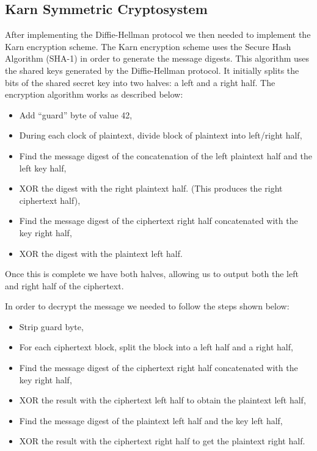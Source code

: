 \documentclass[10pt]{article}
\begin{document}
\subsection{Karn Symmetric Cryptosystem}
After implementing the Diffie-Hellman protocol we then needed to implement the
Karn encryption scheme. The Karn encryption scheme uses the Secure Hash
Algorithm (SHA-1) in order to generate the message digests. This algorithm uses
the shared keys generated by the Diffie-Hellman protocol. It initially splits
the bits of the shared secret key into two halves: a left and a right half. The
encryption algorithm works as described below:
\begin{itemize}
    \item Add ``guard'' byte of value 42,
    \item During each clock of plaintext, divide block of plaintext into
          left/right half,
    \item Find the message digest of the concatenation of the left plaintext
          half and the left key half,
    \item XOR the digest with the right plaintext half. (This produces the
          right ciphertext half),
    \item Find the message digest of the ciphertext right half concatenated
          with the key right half,
    \item XOR the digest with the plaintext left half.
\end{itemize}
Once this is complete we have both halves, allowing us to output both the left
and right half of the ciphertext.

In order to decrypt the message we needed to follow the steps shown below:
\begin{itemize}
    \item Strip guard byte,
    \item For each ciphertext block, split the block into a left half and a
          right half,
    \item Find the message digest of the ciphertext right half concatenated
          with the key right half,
    \item XOR the result with the ciphertext left half to obtain the plaintext
          left half,
    \item Find the message digest of the plaintext left half and the key left
          half,
    \item XOR the result with the ciphertext right half to get the plaintext
          right half.
\end{itemize}
\end{document}
